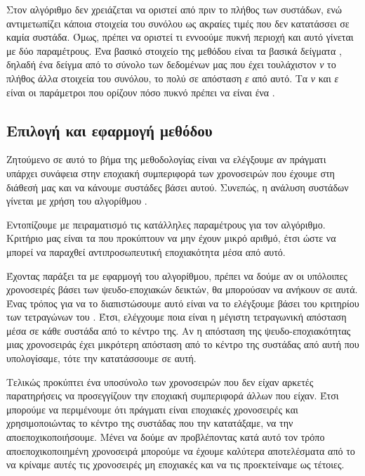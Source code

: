 Στον αλγόριθμο  δεν χρειάζεται να οριστεί από πριν το πλήθος των συστάδων, ενώ αντιμετωπίζει κάποια στοιχεία του συνόλου ως ακραίες τιμές που δεν κατατάσσει σε καμία συστάδα. Όμως, πρέπει να οριστεί τι εννοούμε πυκνή περιοχή και αυτό γίνεται με δύο παραμέτρους. Ένα βασικό στοιχείο της μεθόδου είναι τα βασικά δείγματα , δηλαδή ένα δείγμα από το σύνολο των δεδομένων μας που έχει τουλάχιστον \textit{ν} το πλήθος άλλα στοιχεία του συνόλου, το πολύ σε απόσταση \textit{ε} από αυτό. Τα \textit{ν} και \textit{ε} είναι οι παράμετροι που ορίζουν πόσο πυκνό πρέπει να είναι ένα .

\subsection{Επιλογή και εφαρμογή μεθόδου}

Ζητούμενο σε αυτό το βήμα της μεθοδολογίας είναι να ελέγξουμε αν πράγματι υπάρχει συνάφεια στην εποχιακή συμπεριφορά των χρονοσειρών που έχουμε στη διάθεσή μας και να κάνουμε συστάδες βάσει αυτού. Συνεπώς, η ανάλυση συστάδων γίνεται με χρήση του αλγορίθμου . 

Εντοπίζουμε με πειραματισμό τις κατάλληλες παραμέτρους για τον αλγόριθμο. Κριτήριο μας είναι τα  που προκύπτουν να μην έχουν μικρό αριθμό, έτσι ώστε να μπορεί να παραχθεί αντιπροσωπευτική εποχιακότητα μέσα από αυτό.

Έχοντας παράξει τα  με εφαρμογή του αλγορίθμου, πρέπει να δούμε αν οι υπόλοιπες χρονοσειρές βάσει των ψευδο-εποχιακών δεικτών, θα μπορούσαν να ανήκουν σε αυτά. Ένας τρόπος για να το διαπιστώσουμε αυτό είναι να το ελέγξουμε βάσει του κριτηρίου των τετραγώνων του . Έτσι, ελέγχουμε ποια είναι η μέγιστη τετραγωνική απόσταση μέσα σε κάθε συστάδα από το κέντρο της. Αν η απόσταση της ψευδο-εποχιακότητας μιας χρονοσειράς έχει μικρότερη απόσταση από το κέντρο της συστάδας από αυτή που υπολογίσαμε, τότε την κατατάσσουμε σε αυτή. 

Τελικώς προκύπτει ένα υποσύνολο των χρονοσειρών που δεν είχαν αρκετές παρατηρήσεις να προσεγγίζουν την εποχιακή συμπεριφορά άλλων που είχαν. Έτσι μπορούμε να περιμένουμε ότι πράγματι είναι εποχιακές χρονοσειρές και χρησιμοποιώντας το κέντρο της συστάδας που την κατατάξαμε, να την αποεποχικοποιήσουμε. Μένει να δούμε αν προβλέποντας κατά αυτό τον τρόπο αποεποχικοποιημένη χρονοσειρά μπορούμε να έχουμε καλύτερα αποτελέσματα από το να κρίναμε αυτές τις χρονοσειρές μη εποχιακές και να τις προεκτείναμε ως τέτοιες.

